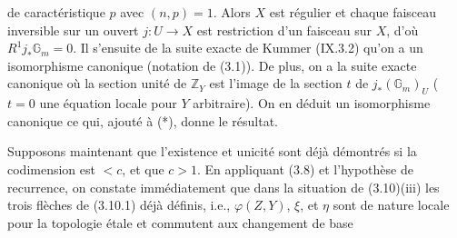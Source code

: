 
de caractéristique $p$ avec $(n,p)=1$. Alors $X$ est régulier et chaque faisceau inversible sur un ouvert $j:U\longrightarrow X$ est restriction d'un faisceau sur $X$, d'où $R^1j_*\mathbb G_m=0$. Il s'ensuite de la suite exacte de Kummer (IX.3.2) qu'on a un isomorphisme canonique
(notation de (3.1)). De plus, on a la suite exacte canonique
où la section unité de  $\mathbb Z_Y$ est l'image de la section $t$ de $j_*(\mathbb G_m)_U$ ($t=0$ une équation locale pour $Y$ arbitraire). On en déduit un isomorphisme canonique
 ce qui, ajouté à (*), donne le résultat.

Supposons maintenant que l'existence et unicité sont déjà démontrés si la codimension est $<c$, et que $c>1$. En appliquant (3.8) et l'hypothèse de recurrence, on constate immédiatement que dans la situation de (3.10)(iii) les trois flèches de  (3.10.1) déjà définis, i.e., $\varphi(Z,Y)$, $\xi$, et $\eta$ sont de nature locale pour la topologie étale et commutent aux changement de base
